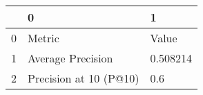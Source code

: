 \begin{tabular}{lll}
\toprule
{} &                       0 &         1 \\
\midrule
0 &                  Metric &     Value \\
1 &       Average Precision &  0.508214 \\
2 &  Precision at 10 (P@10) &       0.6 \\
\bottomrule
\end{tabular}
